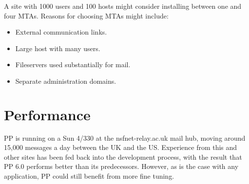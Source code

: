 A site with 1000 users and 100 hosts might consider installing
between one and four MTAs.  Reasons for choosing MTAs might include:
\begin{itemize}
\item	External communication links.
\item	Large host with many users.
\item	Fileservers used substantially for mail.
\item	Separate administration domains.
\end{itemize}

\section{Performance}

PP is running on a Sun 4/330 at the nsfnet-relay.ac.uk mail hub,
moving around 15,000 messages a day between the UK and the US.
Experience from this and other sites has been fed back into the
development process, with the result that PP 6.0 performs better than
its predecessors.  However, as is the case with any application, PP
could still benefit from more fine tuning.
